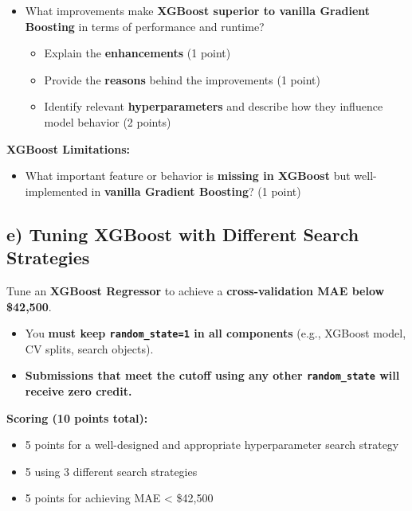 \documentclass[
  letterpaper,
  DIV=11,
  numbers=noendperiod]{scrreprt}
\providecommand{\tightlist}{%
  \setlength{\itemsep}{0pt}\setlength{\parskip}{0pt}}\usepackage{longtable,booktabs,array}
\begin{document}
\begin{itemize}
\tightlist
\item
  What improvements make \textbf{XGBoost superior to vanilla Gradient
  Boosting} in terms of performance and runtime?

  \begin{itemize}
  \tightlist
  \item
    Explain the \textbf{enhancements} (1 point)\\
  \item
    Provide the \textbf{reasons} behind the improvements (1 point)\\
  \item
    Identify relevant \textbf{hyperparameters} and describe how they
    influence model behavior (2 points)
  \end{itemize}
\end{itemize}

\textbf{XGBoost Limitations:}

\begin{itemize}
\tightlist
\item
  What important feature or behavior is \textbf{missing in XGBoost} but
  well-implemented in \textbf{vanilla Gradient Boosting}? (1 point)
\end{itemize}

\subsection{e) Tuning XGBoost with Different Search
Strategies}\label{e-tuning-xgboost-with-different-search-strategies}

Tune an \textbf{XGBoost Regressor} to achieve a \textbf{cross-validation
MAE below \$42,500}.

\begin{itemize}
\tightlist
\item
  You \textbf{must keep \texttt{random\_state=1} in all components}
  (e.g., XGBoost model, CV splits, search objects).
\item
  \textbf{Submissions that meet the cutoff using any other
  \texttt{random\_state} will receive zero credit.}
\end{itemize}

\textbf{Scoring (10 points total):}

\begin{itemize}
\tightlist
\item
  5 points for a well-designed and appropriate hyperparameter search
  strategy
\item
  5 using 3 different search strategies
\item
  5 points for achieving MAE \textless{} \$42,500
\end{itemize}
\end{document}
